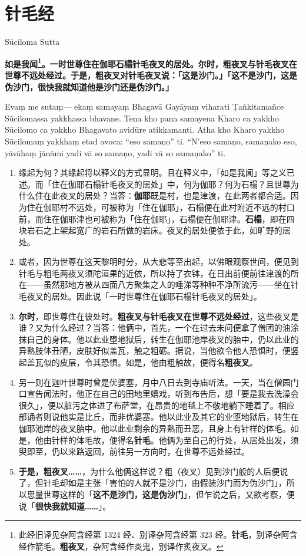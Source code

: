 \section{针毛经}

\begin{center}Sūciloma Sutta\end{center}\vspace{1em}

\textbf{如是我闻\footnote{此经旧译见杂阿含经第 1324 经、别译杂阿含经第 323 经。\textbf{针毛}，别译杂阿含经作箭毛。\textbf{粗夜叉}，杂阿含经作炎鬼，别译作炙夜叉。}。一时世尊住在伽耶石榻针毛夜叉的居处。尔时，粗夜叉与针毛夜叉在世尊不远处经过。于是，粗夜叉对针毛夜叉说：「这是沙门。」「这不是沙门，这是伪沙门，很快我就知道他是沙门还是伪沙门。」}

Evaṃ me sutaṃ— ekaṃ samayaṃ Bhagavā Gayāyaṃ viharati Ṭaṅkitamañce Sūcilomassa yakkhassa bhavane. Tena kho pana samayena Kharo ca yakkho Sūcilomo ca yakkho Bhagavato avidūre atikkamanti. Atha kho Kharo yakkho Sūcilomaṃ yakkhaṃ etad avoca: “eso samaṇo” ti. “N’eso samaṇo, samaṇako eso, yāvāhaṃ jānāmi yadi vā so samaṇo, yadi vā so samaṇako” ti.

\begin{enumerate}\item 缘起为何？其缘起将以释义的方式显明。且在释义中，「如是我闻」等之义已述。而「住在伽耶石榻针毛夜叉的居处」中，何为伽耶？何为石榻？且世尊为什么住在此夜叉的居处？当答：\textbf{伽耶}既是村，也是津渡，在此两者都合适。因为住在伽耶村不远处，可被称为「住在伽耶」，石榻便在此村附近不远的村口前，而住在伽耶津也可被称为「住在伽耶」，石榻便在伽耶津。\textbf{石榻}，即在四块岩石之上架起宽广的岩石所做的岩床。夜叉的居处便依于此，如旷野的居处。
\item 或者，因为世尊在这天黎明时分，从大悲等至出起，以佛眼观察世间，便见到针毛与粗毛两夜叉须陀洹果的近依，所以持了衣钵，在日出前便前往津渡的所在——虽然那地方被从四面八方聚集之人的唾涕等种种不净所流污——坐在针毛夜叉的居处。因此说「一时世尊住在伽耶石榻针毛夜叉的居处」。
\item \textbf{尔时}，即世尊住在彼处时。\textbf{粗夜叉与针毛夜叉在世尊不远处经过}，这些夜叉是谁？又为什么经过？当答：他俩中，首先，一个在过去未问便拿了僧团的油涂抹自己的身体。他以此业堕地狱后，转生在伽耶池岸夜叉的胎中，仍以此业的异熟肢体丑陋，皮肤好似盖瓦，触之粗砺。据说，当他欲令他人恐惧时，便竖起盖瓦似的皮层，令其恐惧。如是，他由粗触故，便得名\textbf{粗夜叉}。
\item 另一则在迦叶世尊时曾是优婆塞，月中八日去到寺庙听法。一天，当在僧园门口宣告闻法时，他正在自己的田地里嬉戏，听到布告后，想「要是我去洗澡会很久」，便以脏污之体进了布萨堂，在昂贵的地毯上不敬地躺下睡着了。相应部诵者则说他实是比丘，而非优婆塞。他以此业及其它的业堕地狱后，转生在伽耶池岸的夜叉胎中。他以此业剩余的异熟而丑恶，且身上有针样的体毛。如是，他由针样的体毛故，便得名\textbf{针毛}。他俩为至自己的行处，从居处出发，须臾即至，仍以来路返回，前往另一方向时，在世尊不远处经过。
\item \textbf{于是，粗夜叉……}，为什么他俩这样说？粗（夜叉）见到沙门般的人后便说了，但针毛却如是主张「害怕的人就不是沙门，由假装沙门而为伪沙门」，所以思量世尊这样的「\textbf{这不是沙门，这是伪沙门}」，但乍说之后，又欲考察，便说「\textbf{很快我就知道……}」。\end{enumerate}

